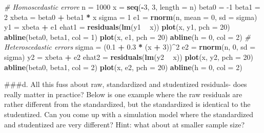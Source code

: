 \documentclass[]{article}
\newenvironment{Shaded}{\begin{snugshade}}{\end{snugshade}}
\newcommand{\CommentTok}[1]{\textcolor[rgb]{0.56,0.35,0.01}{\textit{#1}}}
\newcommand{\DataTypeTok}[1]{\textcolor[rgb]{0.13,0.29,0.53}{#1}}
\newcommand{\DecValTok}[1]{\textcolor[rgb]{0.00,0.00,0.81}{#1}}
\newcommand{\FloatTok}[1]{\textcolor[rgb]{0.00,0.00,0.81}{#1}}
\newcommand{\KeywordTok}[1]{\textcolor[rgb]{0.13,0.29,0.53}{\textbf{#1}}}
\newcommand{\NormalTok}[1]{#1}
\newcommand{\OperatorTok}[1]{\textcolor[rgb]{0.81,0.36,0.00}{\textbf{#1}}}
\newcommand{\StringTok}[1]{\textcolor[rgb]{0.31,0.60,0.02}{#1}}
\begin{document}
\begin{Shaded}
\begin{Highlighting}[]
\CommentTok{# Homoscedastic errore}
\NormalTok{n =}\StringTok{ }\DecValTok{1000}
\NormalTok{x =}\StringTok{ }\KeywordTok{seq}\NormalTok{(}\OperatorTok{-}\DecValTok{3}\NormalTok{, }\DecValTok{3}\NormalTok{, }\DataTypeTok{length =}\NormalTok{ n)}
\NormalTok{beta0 =}\StringTok{ }\DecValTok{-1}
\NormalTok{beta1 =}\StringTok{ }\DecValTok{2}
\NormalTok{xbeta =}\StringTok{ }\NormalTok{beta0 }\OperatorTok{+}\StringTok{ }\NormalTok{beta1 }\OperatorTok{*}\StringTok{ }\NormalTok{x}
\NormalTok{sigma =}\StringTok{ }\DecValTok{1}
\NormalTok{e1 =}\StringTok{ }\KeywordTok{rnorm}\NormalTok{(n, }\DataTypeTok{mean =} \DecValTok{0}\NormalTok{, }\DataTypeTok{sd =}\NormalTok{ sigma)}
\NormalTok{y1 =}\StringTok{ }\NormalTok{xbeta }\OperatorTok{+}\StringTok{ }\NormalTok{e1}
\NormalTok{ehat1 =}\StringTok{ }\KeywordTok{residuals}\NormalTok{(}\KeywordTok{lm}\NormalTok{(y1 }\OperatorTok{~}\StringTok{ }\NormalTok{x))}
\KeywordTok{plot}\NormalTok{(x, y1, }\DataTypeTok{pch =} \DecValTok{20}\NormalTok{)}
\KeywordTok{abline}\NormalTok{(beta0, beta1, }\DataTypeTok{col =} \DecValTok{1}\NormalTok{)}
\KeywordTok{plot}\NormalTok{(x, e1, }\DataTypeTok{pch =} \DecValTok{20}\NormalTok{)}
\KeywordTok{abline}\NormalTok{(}\DataTypeTok{h =} \DecValTok{0}\NormalTok{, }\DataTypeTok{col =} \DecValTok{2}\NormalTok{)}
\CommentTok{# Heteroscedastic errors}
\NormalTok{sigma =}\StringTok{ }\NormalTok{(}\FloatTok{0.1} \OperatorTok{+}\StringTok{ }\FloatTok{0.3} \OperatorTok{*}\StringTok{ }\NormalTok{(x }\OperatorTok{+}\StringTok{ }\DecValTok{3}\NormalTok{))}\OperatorTok{^}\DecValTok{2}
\NormalTok{e2 =}\StringTok{ }\KeywordTok{rnorm}\NormalTok{(n, }\DecValTok{0}\NormalTok{, }\DataTypeTok{sd =}\NormalTok{ sigma)}
\NormalTok{y2 =}\StringTok{ }\NormalTok{xbeta }\OperatorTok{+}\StringTok{ }\NormalTok{e2}
\NormalTok{ehat2 =}\StringTok{ }\KeywordTok{residuals}\NormalTok{(}\KeywordTok{lm}\NormalTok{(y2 }\OperatorTok{~}\StringTok{ }\NormalTok{x))}
\KeywordTok{plot}\NormalTok{(x, y2, }\DataTypeTok{pch =} \DecValTok{20}\NormalTok{)}
\KeywordTok{abline}\NormalTok{(beta0, beta1, }\DataTypeTok{col =} \DecValTok{2}\NormalTok{)}
\KeywordTok{plot}\NormalTok{(x, e2, }\DataTypeTok{pch =} \DecValTok{20}\NormalTok{)}
\KeywordTok{abline}\NormalTok{(}\DataTypeTok{h =} \DecValTok{0}\NormalTok{, }\DataTypeTok{col =} \DecValTok{2}\NormalTok{)}
\end{Highlighting}
\end{Shaded}

\#\#\#d. All this fuss about raw, standardized and studentized
residuals- does really matter in practice? Below is one example where
the raw residuals are rather different from the standardized, but the
standardized is identical to the studentized. Can you come up with a
simulation model where the standardized and studentized are very
different? Hint: what about at smaller sample size?
\end{document}

